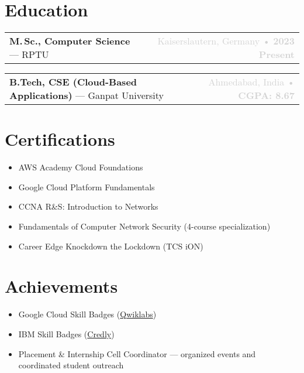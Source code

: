 \documentclass[11pt,a4paper]{article}
\newcommand{\eduheader}[4]{%
  {\normalsize\noindent\begin{tabularx}{\textwidth}{L R}
    \textbf{#1} — #2 & \textcolor{lightgray}{#3 • #4}\\
  \end{tabularx}}\par\vspace{-2pt}}
\begin{document}
\section*{Education}
\eduheader{\textbf{M.\,Sc., Computer Science}}{RPTU}{Kaiserslautern, Germany}{\textbf{2023 \textendash{} Present}}
\eduheader{\textbf{B.Tech, CSE (Cloud-Based Applications)}}{Ganpat University}{Ahmedabad, India}{\textbf{CGPA: 8.67}}

\section*{Certifications}
\raggedcolumns%
\begin{multicols}{2}
\begin{itemize}[leftmargin=*, topsep=0pt, itemsep=0pt, parsep=0pt, partopsep=0pt]
    \item AWS Academy Cloud Foundations
    \item Google Cloud Platform Fundamentals
    \item CCNA R\&S: Introduction to Networks
    \columnbreak%
    \item Fundamentals of Computer Network Security (4-course special\-ization)
    \item Career Edge \textemdash{} Knockdown the Lockdown (TCS iON)
\end{itemize}
\end{multicols}

\section*{Achievements}
\raggedcolumns%
\begin{multicols}{2}
\begin{itemize}[leftmargin=*, topsep=0pt, itemsep=0pt, parsep=0pt, partopsep=0pt]
    \item Google Cloud Skill Badges (\href{https://www.cloudskillsboost.google/public_profiles/e4dd330f-6277-423a-b75d-1ba0dde516fc}{Qwiklabs})
    \item IBM Skill Badges (\href{https://www.credly.com/users/jaival-saija/badges#credly}{Credly})
    \columnbreak%
    \item Placement \& Internship Cell Coordinator — organized events and coordinated student outreach
\end{itemize}
\end{multicols}
\end{document}
